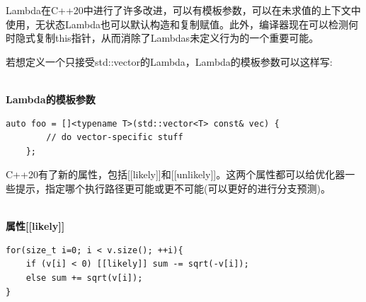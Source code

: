 
Lambda在C++20中进行了许多改进，可以有模板参数，可以在未求值的上下文中使用，无状态Lambda也可以默认构造和复制赋值。此外，编译器现在可以检测何时隐式复制this指针，从而消除了Lambdas未定义行为的一个重要可能。

若想定义一个只接受std::vector的Lambda，Lambda的模板参数可以这样写:

\hspace*{\fill} \\ %
\noindent
\textbf{Lambda的模板参数}
\begin{lstlisting}[style=styleCXX]
auto foo = []<typename T>(std::vector<T> const& vec) {
		// do vector-specific stuff
	};
\end{lstlisting}


C++20有了新的属性，包括[[likely]]和[[unlikely]]。这两个属性都可以给优化器一些提示，指定哪个执行路径更可能或更不可能(可以更好的进行分支预测)。

\hspace*{\fill} \\ %
\noindent
\textbf{属性[[likely]]}
\begin{lstlisting}[style=styleCXX]
for(size_t i=0; i < v.size(); ++i){
	if (v[i] < 0) [[likely]] sum -= sqrt(-v[i]);
	else sum += sqrt(v[i]);
}
\end{lstlisting}
